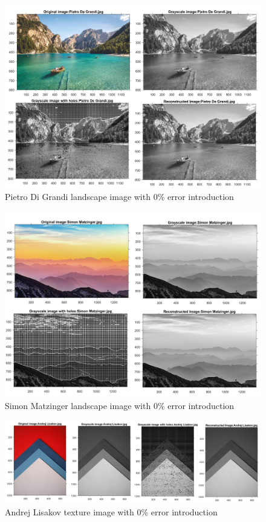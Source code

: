 \begin{figure}[!ht]
\center \includegraphics[scale=0.37]{PietroDiGrandi.jpg}
\caption{Pietro Di Grandi landscape image with 0\% error introduction}
\label{fig:pdgl}
\end{figure}

\begin{figure}[!ht]
\center \includegraphics[scale=0.37]{SimonMatzinger.jpg}
\caption{Simon Matzinger landscape image with 0\% error introduction}
\label{fig:sml}
\end{figure}

\begin{figure}[!ht]
\center \includegraphics[scale=0.28]{AndrejLisakov.jpg}
\caption{Andrej Lisakov texture image with 0\% error introduction}
\label{fig:alt}
\end{figure}

